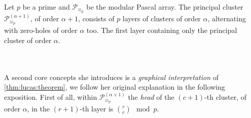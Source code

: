 \begin{theorem}
    Let $p$ be a prime and $\mathcal{P}_{\equiv_{p}}$ be the 
    modular Pascal array. The principal cluster $\mathcal{P}_{\equiv_{p}}^{(\alpha+1)}$,
    of order $\alpha + 1$, consists of $p$ layers of clusters of order $\alpha$, alternating
    with zero-holes of order $\alpha$ too. The first layer containing only the principal
    cluster of order $\alpha$.
\end{theorem}
\quad
\\\\
A second core concepts she introduces is a \emph{graphical interpretation} of
\autoref{thm:lucas:theorem}, we follow her original explanation in the
following exposition.  First of all, within
$\mathcal{P}_{\equiv_{p}}^{(\alpha+1)}$ the \emph{head} of the $(c+1)$-th cluster,
of order $\alpha$, in the $(r+1)$-th layer is ${{r}\choose{c}}\mod p$.

